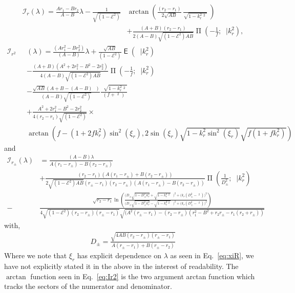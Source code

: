 \documentclass[12pt, amsmath]{revtex4-2}
\newcommand\lam{\lambda}
\newcommand\EN{\mathcal{E}}
\DeclareMathOperator{\snr}{sin(\xi_r)}
\DeclareMathOperator{\cnr}{cos(\xi_r)}
\DeclareMathOperator{\amr}{\xi_r}
\newcommand{\elE}{\operatorname{\mathsf{E}}}%
\newcommand{\elPi}{\operatorname{\mathsf{\Pi}}}%
\begin{document}
\begin{equation}\label{eq:Ir}
    \begin{aligned}
   \mathcal{I}_r(\lam) =\frac{Ar_1-Br_2}{A-B}\lam -\frac{1}{\sqrt{(1-\EN^2)}}&\arctan  \left( \frac{(r_2-r_1)}{2\sqrt{AB}}\frac{\snr}{\sqrt{1-k_r^2\snr^2}}\right)\\
    & + \frac{(A+B)(r_2-r_1)}{2(A-B)\sqrt{(1-\EN^2) A B}}\elPi\left( -\frac{1}{f}; \amr|k_r^2\right),
    \end{aligned}
\end{equation}
\begin{equation}\label{eq:Ir2}
    \begin{aligned}
   \mathcal{I}_{r^2}&(\lam) =\frac{(Ar_1^2-Br_2^2)}{(A-B)}\lam + \frac{\sqrt{AB}}{(1-\EN^2)}\elE\left(\amr|k_r^2\right)\\
  &- \frac{(A+B)(A^2+2r_1^2-B^2-2r_2^2)}{4(A-B)\sqrt{(1-\EN^2) A B}}\elPi(-\frac{1}{f};\amr|k_r^2)\\
  &-\frac{\sqrt{A B}(A+B-(A-B)\cnr)}{(A-B)\sqrt{(1-\EN^2)}}\frac{\snr\sqrt{1-k_r^2\snr^2}}{(f+\snr^2)}\\
  &+\frac{A^2+2r_1^2-B^2-2r_2^2}{4(r_2-r_1)\sqrt{(1-\EN^2)}}\times\\
  \;\;\;\;\;\;\;&\arctan\left(f - (1+2 f k_r^2)\sin^2(\xi_r), 2 \sin(\xi_r) \sqrt{1-k_r^2\sin^2(\xi_r)}\sqrt{f(1+f k_r^2)}\right) 
    \end{aligned}
\end{equation}  
and
\begin{equation}\label{eq:Irpm}
    \begin{aligned}
   \mathcal{I}_{r_{\pm}}(\lam) &= \frac{(A-B)\lam}{A(r_1-r_{\pm})-B(r_2-r_{\pm})} \\
   &+ \frac{(r_2-r_1)(A(r_1-r_{\pm})+B(r_2-r_{\pm}))}{2\sqrt{(1-\EN^2) A B}(r_{\pm}-r_1)(r_2-r_{\pm})(A(r_1-r_{\pm})-B(r_2-r_{\pm}))}\elPi\left(\frac{1}{D_{\pm}^2}; \amr|k_r^2\right)\\
   -&\frac{\sqrt{r_2-r_1} \ln\left( \frac{\big(D_{\pm} \sqrt{1-D_{\pm}^2k_r^2} + \sqrt{1-k_r^2\snr^2}\snr\big)^2+ \big(k_r(D_{\pm}^2-\snr^2)\big)^2}{\big(D_{\pm} \sqrt{1-D_{\pm}^2k_r^2} -\sqrt{1-k_r^2\snr^2}\snr\big)^2+ \big(k_r(D_{\pm}^2-\snr^2)\big)^2}\right)
    }{4\sqrt{(1-\EN^2)(r_2-r_{\pm})(r_{\pm}-r_1)}\sqrt{(A^2(r_{\pm}-r_1)-(r_2-r_{\pm})(r_1^2-B^2+r_2r_{\pm}-r_1(r_2+r_{\pm}))}}
    \end{aligned}
\end{equation}
with,
\begin{align*}
    D_{\pm} = \frac{\sqrt{4AB(r_2-r_{\pm})(r_{\pm}- r_1)}}{A(r_{\pm}-r_1)+B(r_{\pm}-r_2)}
\end{align*}
Where we note that $\xi_r$ has explicit dependence on $\lam$ as seen in Eq.~\eqref{eq:xiR}, we have not explicitly stated it in the above in the interest of readability. The $\arctan$ function seen in Eq.~\eqref{eq:Ir2} is the two argument arctan function which tracks the sectors of the numerator and denominator.
\end{document}

